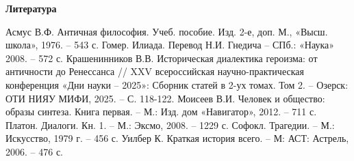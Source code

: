     {\centering \textbf{Литература} \par}
    Асмус В.Ф. Античная философия. Учеб. пособие. Изд. 2-е, доп. М., «Высш. школа», 1976. – 543 с.
    Гомер. Илиада. Перевод Н.И. Гнедича – СПб.: «Наука» 2008. – 572 с.
    Крашенинников В.В. Историческая диалектика героизма: от античности до Ренессанса // XXV всероссийская научно-практическая конференция «Дни науки – 2025»: Сборник статей в 2-ух томах. Том 2. – Озерск: ОТИ НИЯУ МИФИ, 2025. – С. 118-122.
    Моисеев В.И. Человек и общество: образы синтеза. Книга первая. – М.: Изд. дом «Навигатор», 2012. – 711 с.
    Платон. Диалоги. Кн. 1. – М.: Эксмо, 2008. – 1229 с.
    Софокл. Трагедии. – М.: Искусство, 1979 г. – 456 с.
    Уилбер К. Краткая история всего. – М: АСТ: Астрель, 2006. – 476 с.
\fi
